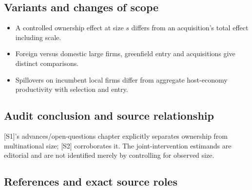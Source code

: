\documentclass[11pt,a4paper]{article}
\begin{document}
\subsection*{Variants and changes of scope}

\begin{itemize}
\item A controlled ownership effect at size \(s\) differs from an acquisition's total effect including scale.
\item Foreign versus domestic large firms, greenfield entry and acquisitions give distinct comparisons.
\item Spillovers on incumbent local firms differ from aggregate host-economy productivity with selection and entry.
\end{itemize}

\subsection*{Audit conclusion and source relationship}

[S1]'s advances/open-questions chapter explicitly separates ownership from multinational size; [S2] corroborates it. The joint-intervention estimands are editorial and are not identified merely by controlling for observed size.

\subsection*{References and exact source roles}
\end{document}
